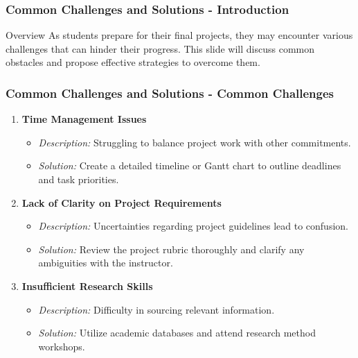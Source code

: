 \documentclass{beamer}
\begin{document}
\begin{frame}[fragile]
    \frametitle{Common Challenges and Solutions - Introduction}
    \begin{block}{Overview}
        As students prepare for their final projects, they may encounter various challenges that can hinder their progress. This slide will discuss common obstacles and propose effective strategies to overcome them.
    \end{block}
\end{frame}

\begin{frame}[fragile]
    \frametitle{Common Challenges and Solutions - Common Challenges}
    \begin{enumerate}
        \item \textbf{Time Management Issues}
            \begin{itemize}
                \item \textit{Description:} Struggling to balance project work with other commitments.
                \item \textit{Solution:} Create a detailed timeline or Gantt chart to outline deadlines and task priorities.
            \end{itemize}
        
        \item \textbf{Lack of Clarity on Project Requirements}
            \begin{itemize}
                \item \textit{Description:} Uncertainties regarding project guidelines lead to confusion.
                \item \textit{Solution:} Review the project rubric thoroughly and clarify any ambiguities with the instructor.
            \end{itemize}

        \item \textbf{Insufficient Research Skills}
            \begin{itemize}
                \item \textit{Description:} Difficulty in sourcing relevant information.
                \item \textit{Solution:} Utilize academic databases and attend research method workshops.
            \end{itemize}
    \end{enumerate}
\end{frame}
\end{document}

